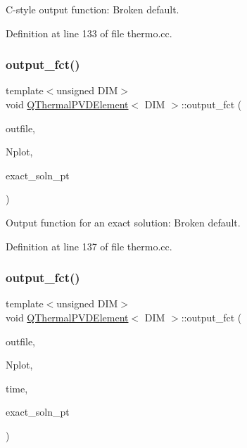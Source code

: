 C-\/style output function\+: Broken default. 



Definition at line 133 of file thermo.\+cc.

\mbox{\label{classQThermalPVDElement_accda081c3fb783b2c24715ec0c8e8e19}} 
\subsubsection{\texorpdfstring{output\+\_\+fct()}{output\_fct()}\hspace{0.1cm}{\footnotesize\ttfamily [1/2]}}
{\footnotesize\ttfamily template$<$unsigned D\+IM$>$ \\
void \hyperlink{classQThermalPVDElement}{Q\+Thermal\+P\+V\+D\+Element}$<$ D\+IM $>$\+::output\+\_\+fct (\begin{DoxyParamCaption}\item[{ostream \&}]{outfile,  }\item[{const unsigned \&}]{Nplot,  }\item[{Finite\+Element\+::\+Steady\+Exact\+Solution\+Fct\+Pt}]{exact\+\_\+soln\+\_\+pt }\end{DoxyParamCaption})\hspace{0.3cm}{\ttfamily [inline]}}



Output function for an exact solution\+: Broken default. 



Definition at line 137 of file thermo.\+cc.

\mbox{\label{classQThermalPVDElement_a0bb6609214fc7991950848806f9fb742}} 
\subsubsection{\texorpdfstring{output\+\_\+fct()}{output\_fct()}\hspace{0.1cm}{\footnotesize\ttfamily [2/2]}}
{\footnotesize\ttfamily template$<$unsigned D\+IM$>$ \\
void \hyperlink{classQThermalPVDElement}{Q\+Thermal\+P\+V\+D\+Element}$<$ D\+IM $>$\+::output\+\_\+fct (\begin{DoxyParamCaption}\item[{ostream \&}]{outfile,  }\item[{const unsigned \&}]{Nplot,  }\item[{const double \&}]{time,  }\item[{Finite\+Element\+::\+Unsteady\+Exact\+Solution\+Fct\+Pt}]{exact\+\_\+soln\+\_\+pt }\end{DoxyParamCaption})\hspace{0.3cm}{\ttfamily [inline]}}



